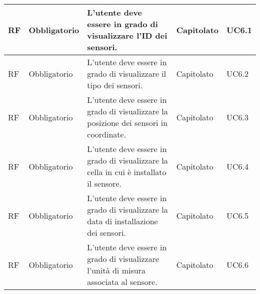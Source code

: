 \begin{longtable}{|C{1cm}|C{2cm}|>{\raggedright}m{5cm}|C{2cm}|C{1.5cm}|}
    \hline
     RF & Obbligatorio        & L'utente deve essere in grado di visualizzare l'ID dei sensori.                                                                                                                                                                    & Capitolato      & UC6.1               \\
    \hline
     RF & Obbligatorio        & L'utente deve essere in grado di visualizzare il tipo dei sensori.                                                                                                                                                                 & Capitolato      & UC6.2               \\
    \hline
     RF & Obbligatorio        & L'utente deve essere in grado di visualizzare la posizione dei sensori in coordinate.                                                                                                                                                            & Capitolato      & UC6.3               \\
    \hline
     RF & Obbligatorio        & L'utente deve essere in grado di visualizzare la cella in cui è installato il sensore.                                                                                                                                                & Capitolato      & UC6.4               \\
    \hline
     RF & Obbligatorio        & L'utente deve essere in grado di visualizzare la data di installazione dei sensori.                                                                                                                                                & Capitolato      & UC6.5               \\
    \hline
     RF & Obbligatorio        & L'utente deve essere in grado di visualizzare l'unità di misura associata al sensore.                                                                                                                                              & Capitolato      & UC6.6               \\
    \hline
\end{longtable}